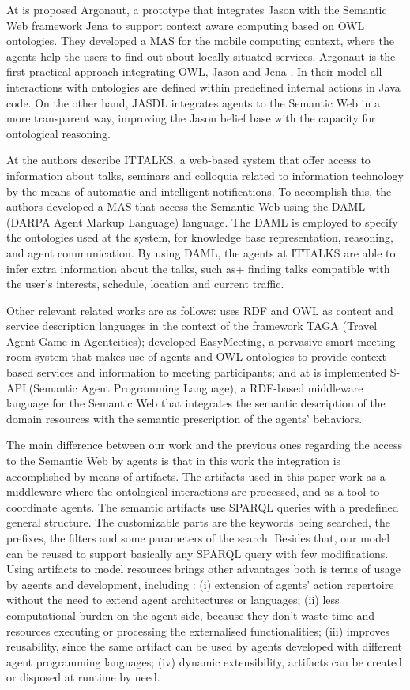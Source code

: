 \documentclass[a4paper,twoside]{article}
\begin{document}
At \cite{refC} is proposed Argonaut, a prototype that integrates Jason with the Semantic Web framework Jena to support context aware computing based on OWL ontologies. They developed a MAS for the mobile computing context, where the agents help the users to find out about locally situated services. Argonaut is the first practical approach integrating OWL, Jason and Jena \cite{refC}. In their model all interactions with ontologies are defined within predefined internal actions in Java code. On the other hand, JASDL integrates agents to the Semantic Web in a more transparent way, improving the Jason belief base with the capacity for ontological reasoning.

At \cite{refA} the authors describe ITTALKS, a web-based system that offer access to information about talks, seminars and colloquia related to information technology by the means of automatic and intelligent notifications. To accomplish this, the authors developed a MAS that access the Semantic Web using the DAML (DARPA Agent Markup Language) language. The DAML is employed to specify the ontologies used at the system, for knowledge base representation, reasoning, and agent communication. By using DAML, the agents at ITTALKS are able to infer extra information about the talks, such as+
 finding talks compatible with the user's interests, schedule, location and current traffic.

Other relevant related works are as follows: \cite{refD} uses RDF and OWL as content and service description languages in the context of the framework TAGA (Travel Agent Game in Agentcities); \cite{refE} developed EasyMeeting, a pervasive smart meeting room system that makes use of agents and OWL ontologies to provide context-based services and information to meeting participants; and at \cite{refF} is implemented S-APL(Semantic Agent Programming Language), a RDF-based middleware language for the Semantic Web that integrates the semantic description of the domain resources with the semantic prescription of the agents' behaviors.

The main difference between our work and the previous ones regarding the access to the Semantic Web by agents is that in this work the integration is accomplished by means of artifacts. The artifacts used in this paper work as a middleware where the ontological interactions are processed, and as a tool to coordinate agents. The semantic artifacts use SPARQL queries with a predefined general structure. The customizable parts are the keywords being searched, the prefixes, the filters and some parameters of the search. Besides that, our model can be reused to support basically any SPARQL query with few modifications. Using artifacts to model resources brings other advantages both is terms of usage by agents and development, including \cite{ref5}: (i) extension of agents' action repertoire without the  need to extend agent architectures or languages; (ii) less computational burden on the agent side, because they don't waste time and resources executing or processing the externalised functionalities; (iii) improves reusability, since the same artifact can be used by agents developed with different agent programming languages; (iv) dynamic extensibility, artifacts can be created or disposed at runtime by need.
\end{document}
